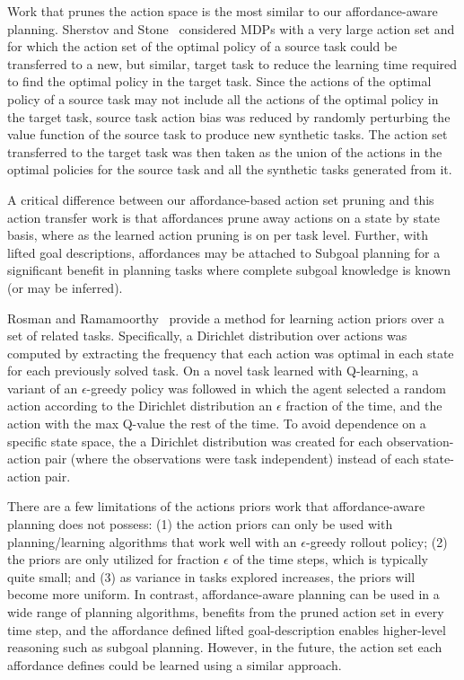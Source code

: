 \documentclass[]{article}
\begin{document}
Work that prunes the action space is the most similar to our affordance-aware planning.
Sherstov and Stone~\citep{sherstov2005improving} considered MDPs with a very large action set and for which the action
set of the optimal policy of a source task could be transferred to a new, but similar, target
task to reduce the learning time required to find the optimal policy in the target task. Since the actions
of the optimal policy of a source task may not include all the actions of the optimal policy
in the target task, source task action bias was reduced by randomly perturbing the value function
of the source task to produce new synthetic tasks. The action set transferred to the target task
was then taken as the union of the actions in the optimal policies for the source task and all the
synthetic tasks generated from it.

A critical difference between our affordance-based action set pruning and this action transfer
work is that affordances prune away actions on a state by state basis, where
as the learned action pruning is on per task level. %
Further,
with lifted goal descriptions, affordances may be attached to Subgoal planning for a significant
benefit in planning tasks where complete subgoal knowledge is known (or may be inferred).

Rosman and Ramamoorthy~\citep{rosman2012good} provide a method for learning action priors over a set of related tasks. Specifically, a Dirichlet distribution over actions was computed by extracting the frequency that each action was optimal in each state for each previously solved task. On a novel task learned with Q-learning, a variant of an $\epsilon$-greedy policy was followed in which the agent selected a random action according to the Dirichlet distribution an $\epsilon$ fraction of the time, and the action with the max Q-value the rest of the time. To avoid dependence on a specific state space, the a Dirichlet distribution was created for each observation-action pair (where the observations were task independent) instead of each state-action pair.

There are a few limitations of the actions priors work that affordance-aware planning does not possess: (1) the action priors can only be used with planning/learning algorithms that work well with an $\epsilon$-greedy rollout policy; (2) the priors are only utilized for fraction $\epsilon$ of the time steps, which is typically quite small; and (3) as variance in tasks explored increases, the priors will become more uniform. In contrast, affordance-aware planning can be used in a wide range of planning algorithms, benefits from the pruned action set in every time step, and the affordance defined lifted goal-description enables higher-level reasoning such as subgoal planning. However, in the future, the action set each affordance defines could be learned using a similar approach.
\end{document}

